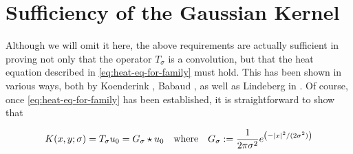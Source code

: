     \section{Sufficiency of the Gaussian Kernel}
    
    Although we will omit it here, the above requirements are actually sufficient in proving not only that the operator $T_\sigma$ is a convolution, but that the heat equation described in \cref{eq:heat-eq-for-family} must hold. This has been shown in various ways, both by Koenderink \cite{Koenderink}, Babaud \cite{babaud}, as well as Lindeberg in \cite{GSST-book}. Of course, once \cref{eq:heat-eq-for-family} has been established, it is straightforward to show that
    
    \begin{equation}
       K(x,y;\sigma) = T_{\sigma} u_0 = G_\sigma \star u_0
       	\quad \textrm{where}\quad
       	G_\sigma := \frac{1}{2\pi \sigma^2} e^{\left(-\vert x\vert^2 / (2\sigma^2)\right)}
        \end{equation}
    
